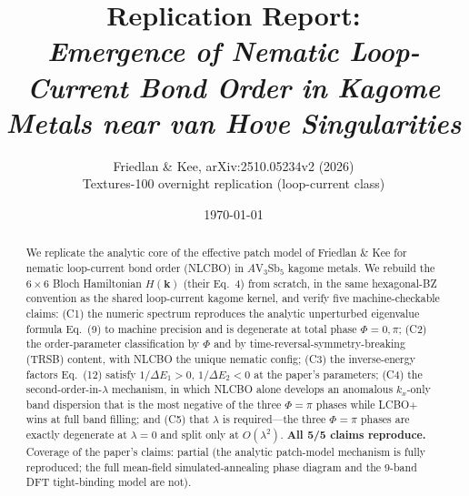 \documentclass[11pt]{article}
\title{Replication Report: \\ \emph{Emergence of Nematic Loop-Current Bond Order in
Kagome Metals near van Hove Singularities}}
\author{Friedlan \& Kee, arXiv:2510.05234v2 (2026) \\[4pt]
Textures-100 overnight replication (loop-current class)}
\date{\today}
\begin{document}
\maketitle

\begin{abstract}
We replicate the analytic core of the effective patch model of Friedlan \& Kee for
nematic loop-current bond order (NLCBO) in $A$V$_3$Sb$_5$ kagome metals. We rebuild
the $6\times6$ Bloch Hamiltonian $H(\mathbf{k})$ (their Eq.~4) from scratch, in the
same hexagonal-BZ convention as the shared loop-current kagome kernel, and verify
five machine-checkable claims: (C1) the numeric spectrum reproduces the analytic
unperturbed eigenvalue formula Eq.~(9) to machine precision and is degenerate at
total phase $\Phi=0,\pi$; (C2) the order-parameter classification by $\Phi$ and by
time-reversal-symmetry-breaking (TRSB) content, with NLCBO the unique nematic
config; (C3) the inverse-energy factors Eq.~(12) satisfy $1/\Delta E_1>0$,
$1/\Delta E_2<0$ at the paper's parameters; (C4) the second-order-in-$\lambda$
mechanism, in which NLCBO alone develops an anomalous $k_x$-only band dispersion
that is the most negative of the three $\Phi=\pi$ phases while LCBO$+$ wins at full
band filling; and (C5) that $\lambda$ is required---the three $\Phi=\pi$ phases are
exactly degenerate at $\lambda=0$ and split only at $O(\lambda^2)$.
\textbf{All 5/5 claims reproduce.} Coverage of the paper's claims: partial (the
analytic patch-model mechanism is fully reproduced; the full mean-field
simulated-annealing phase diagram and the 9-band DFT tight-binding model are not).
\end{abstract}
\end{document}
